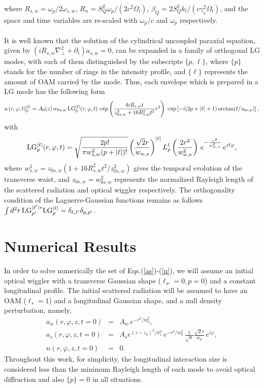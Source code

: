 \documentclass[aps,pra,preprint,showpacs,preprintnumbers,amsmath,amssymb]{revtex4-1}
\begin{document}
where $R_{s,w} = \omega_p/2 \omega_{s,w}$, $R_n = S_Q^2 \omega_p/(2c^2\Omega_l)$, $\beta_Q = 2 S_Q^2  k_l/(c \gamma_e^2 \Omega_l) $, and the space and time variables are re-scaled with $\omega_p/c$ and $\omega_p$ respectively. 
\\
\\
It is well known that the solution of the  cylindrical uncoupled  paraxial equation, given by $(i R_{s,w} \nabla^2_\perp + \partial_t)a_{s,w} = 0 $,  can be expanded in a  family of orthogonal LG modes, with  each of them  distinguished by the subscripts $\{p,\ell\}$, where $\{p\}$ stands for the number of rings in the intensity profile, and $\{\ell\}$ represents the amount of OAM carried by the mode. Thus, each envelope which is prepared in a LG mode has the following form
\begin{equation}
 a\, (r, \varphi,t)^{|\ell|}_{p}= A_0(z)\, w_{0s,w} \, \textnormal{LG}^{|\ell|}_{p}(r,\varphi,t)  \, \,\textnormal{exp}\left(\frac{4iR_{s,w} t}{z_{0s,w}^2 + 16 R_{s,w}^2 t^2} r^2\right) \,\, \textnormal{exp} \left[ -i( 2p + |\ell| + 1)\arctan(t/z_{0s,w}) \right],    
\end{equation} 
with 
\begin{equation}
\textnormal{LG}^{|\ell|}_{p}(r,\varphi,t) = \sqrt{\frac{2p!}{\pi w^2_{s,w} (p + |\ell|)!}} \left(  \frac{\sqrt{2} r}{w_{w,s}} \right)^{|\ell|} L^{\ell}_p \left( \frac{2 r^2}{w^2_{w,s}} \right) \, e^{- \frac{r^2}{w^2_{w,s}}} \, e^{i \ell \varphi},
\end{equation}
where $w_{s,w}^2= z_{0s,w} (1 + 16 R^2_{s,w} t^2/z_{0s,w}^2) $ gives the temporal evolution of the transverse waist, and $z_{0s,w} = w_{0s,w}^2$ represents the normalized Rayleigh length of the scattered radiation and optical wiggler respectively. The orthogonality condition of the Laguerre-Gaussian functions remains as follows  $\int { d^2 r }\, \textnormal{LG}^{|\ell'|*}_{p'} \textnormal{LG}^{|\ell|}_{p}  = \delta_{\ell, \ell'} \delta_{p,p'}$.


\section{Numerical Results}

 
In order to solve numerically the set of Eqs.(\ref{as})-(\ref{n}), we will assume an initial optical wiggler with a transverse Gaussian shape ($\ell_w=0,p=0$) and a constant longitudinal profile. The initial scattered radiation will be assumed to have an OAM ($\ell_s = 1 $) and a longitudinal Gaussian shape, and a null density perturbation, namely, 
\begin{eqnarray}
a_w(r,\varphi ,z,t=0) &=& A_w \, e^{-r^2/w_0^2} \label{aw1},\\
a_s(r,\varphi, z,t=0) &=& A_s e^{(z-z_0)^2/\sigma_z^2}\, e^{-r^2/w_0^2} \,\frac{1}{\sqrt{\pi}} \frac{\sqrt{2} r}{w_0} \, e^{i  \varphi} \label{as1},\\
n(r,\varphi, z,t=0) &=& 0 \label{n1}.
\end{eqnarray}
Throughout this work, for simplicity, the longitudinal interaction size is considered  less than the  minimum Rayleigh length of each  mode to avoid  optical diffraction and also $\{p\} = 0$ in all situations.
\\ 
\end{document}
